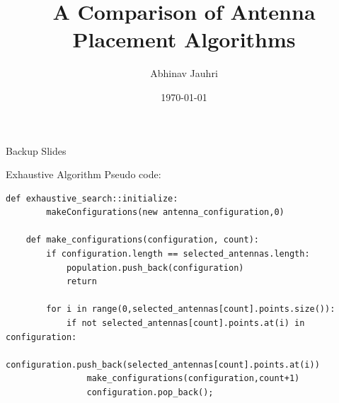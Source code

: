 \documentclass{beamer}
\title{\color{univred} A Comparison of Antenna Placement Algorithms}
\author{Abhinav Jauhri}
\date{\today}
\begin{document}
\begin{frame}
    \color{univred}
    \titlepage
    \begin{center}
        {\tiny Backup Slides}
\end{center}
\end{frame}

\begin{frame}[fragile]{Exhaustive Algorithm}
    Pseudo code: 
    \vspace*{0.5cm}
    \begin{Verbatim}[fontsize=\tiny]
    def exhaustive_search::initialize: 
        makeConfigurations(new antenna_configuration,0) 

    def make_configurations(configuration, count): 
        if configuration.length == selected_antennas.length: 
            population.push_back(configuration)
            return 

        for i in range(0,selected_antennas[count].points.size()):
            if not selected_antennas[count].points.at(i) in configuration: 
                configuration.push_back(selected_antennas[count].points.at(i))
                make_configurations(configuration,count+1)
                configuration.pop_back();
    \end{Verbatim}
\end{frame}
\end{document}
